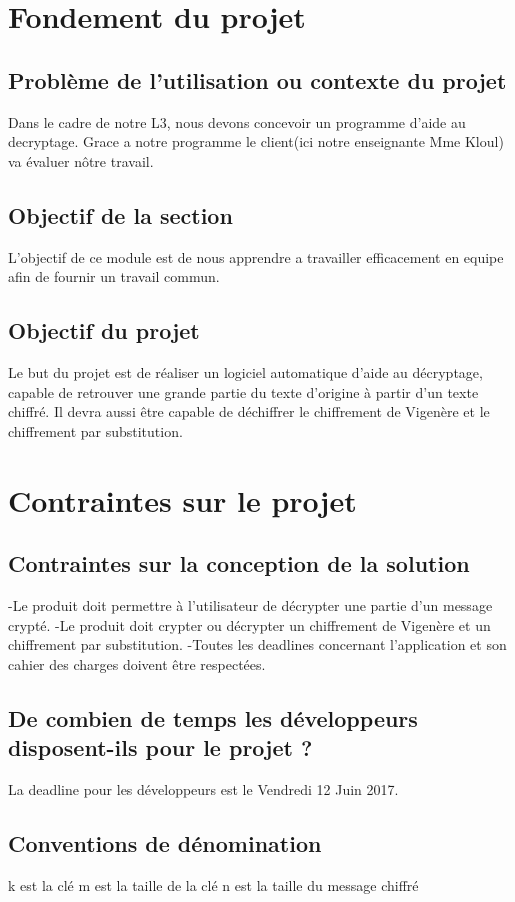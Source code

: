 \documentclass[a4]{article}
\begin{document}
	\section{Fondement du projet}
		\subsection{Problème de l'utilisation ou contexte du projet}
			Dans le cadre de notre L3, nous devons concevoir un programme d'aide au decryptage.
			Grace a notre programme le client(ici notre enseignante Mme Kloul) va évaluer nôtre travail.
		\subsection{Objectif de la section}
			L'objectif de ce module est de nous apprendre a travailler efficacement en equipe afin 
			de fournir un travail commun.
		\subsection{Objectif du projet}
			Le but du projet est de réaliser un logiciel automatique d'aide au décryptage, capable
			de retrouver une grande partie du texte d'origine à partir d'un texte chiffré. Il devra
			aussi être capable de déchiffrer le chiffrement de Vigenère et le chiffrement par 
			substitution.
	\section{Contraintes sur le projet}
		\subsection{Contraintes sur la conception de la solution}
			-Le produit doit permettre à l'utilisateur de décrypter une partie d'un message crypté.
			-Le produit doit crypter ou décrypter un chiffrement de Vigenère et un chiffrement par 
			substitution.
			-Toutes les deadlines concernant l'application et son cahier des charges doivent être
			 respectées.
		\subsection{ De combien de temps les développeurs disposent-ils pour le projet ?}
			La deadline pour les développeurs est le Vendredi 12 Juin 2017.
		\subsection{Conventions de dénomination}
			k est la clé
			m est la taille de la clé
			n est la taille du message chiffré
\end{document}
